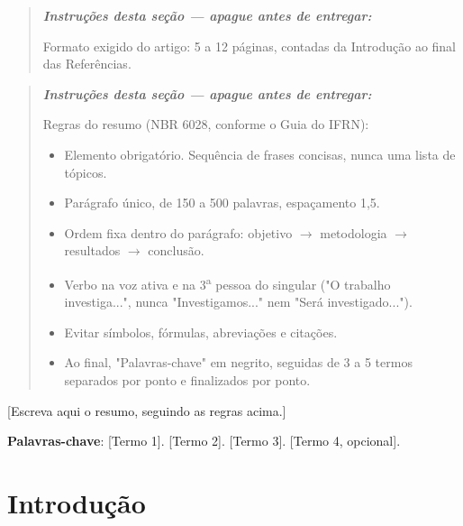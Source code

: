 \documentclass[article,12pt,a4paper,oneside]{abntex2}
\newenvironment{instrucoes}{%
  \begin{quotation}\footnotesize\itshape
  \noindent\textbf{\upshape Instruções desta seção — apague antes de entregar:}\par\smallskip
}{%
  \end{quotation}
}
\begin{document}
\maketitle
\thispagestyle{fancy}

\begin{instrucoes}
Formato exigido do artigo: 5 a 12 páginas, contadas da Introdução ao final
das Referências.
\end{instrucoes}

\begin{resumo}
\begin{instrucoes}
Regras do resumo (NBR 6028, conforme o Guia do IFRN):
\begin{itemize}
  \item Elemento obrigatório. Sequência de frases concisas, nunca uma lista de tópicos.
  \item Parágrafo único, de 150 a 500 palavras, espaçamento 1,5.
  \item Ordem fixa dentro do parágrafo: objetivo $\to$ metodologia $\to$ resultados $\to$ conclusão.
  \item Verbo na voz ativa e na 3\textsuperscript{a} pessoa do singular ("O trabalho investiga...", nunca "Investigamos..." nem "Será investigado...").
  \item Evitar símbolos, fórmulas, abreviações e citações.
  \item Ao final, "Palavras-chave" em negrito, seguidas de 3 a 5 termos separados por ponto e finalizados por ponto.
\end{itemize}
\end{instrucoes}

[Escreva aqui o resumo, seguindo as regras acima.]

\vspace{\onelineskip}
\noindent
\textbf{Palavras-chave}: [Termo 1]. [Termo 2]. [Termo 3]. [Termo 4, opcional].
\end{resumo}

\textual
\pagestyle{fancy}

\section{Introdução}
\end{document}
